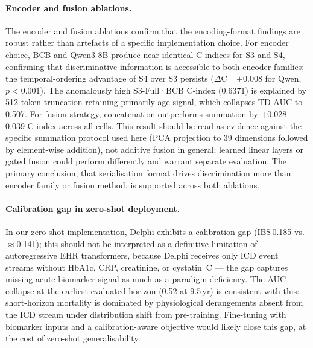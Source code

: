 \paragraph{Encoder and fusion ablations.}
The encoder and fusion ablations confirm that the encoding-format findings are
robust rather than artefacts of a specific implementation choice.
For encoder choice, BCB and Qwen3-8B produce near-identical C-indices for S3
and S4, confirming that discriminative information is accessible to both
encoder families; the temporal-ordering advantage of S4 over S3 persists
($\Delta$C\,=\,$+$0.008 for Qwen, $p<0.001$).
The anomalously high S3-Full·BCB C-index (0.6371) is explained by 512-token
truncation retaining primarily age signal, which collapses TD-AUC to 0.507.
For fusion strategy, concatenation outperforms summation by
$+$0.028--$+$0.039 C-index across all cells.
This result should be read as evidence against the specific summation protocol
used here (PCA projection to 39 dimensions followed by element-wise addition),
not additive fusion in general; learned linear layers or gated fusion could
perform differently and warrant separate evaluation.
The primary conclusion, that serialisation format drives discrimination more
than encoder family or fusion method, is supported across both ablations.

\paragraph{Calibration gap in zero-shot deployment.}
In our zero-shot implementation, Delphi exhibits a calibration gap
(IBS\,0.185 vs.\ $\approx$0.141); this should not be interpreted as a
definitive limitation of autoregressive EHR transformers, because Delphi
receives only ICD event streams without HbA1c, CRP, creatinine, or
cystatin~C --- the gap captures missing acute biomarker signal as much as a
paradigm deficiency.
The AUC collapse at the earliest evaluated horizon (0.52 at 9.5\,yr) is
consistent with this: short-horizon mortality is dominated by physiological
derangements absent from the ICD stream under distribution shift from
pre-training.
Fine-tuning with biomarker inputs and a calibration-aware objective would
likely close this gap, at the cost of zero-shot generalisability.

